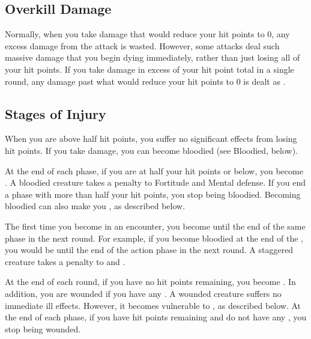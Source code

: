     \subsection{Overkill Damage}\label{Overkill Damage}
        Normally, when you take damage that would reduce your hit points to 0, any excess damage from the attack is wasted.
        However, some attacks deal such massive damage that you begin dying immediately, rather than just losing all of your hit points.
        If you take damage in excess of your  hit point total in a single round, any damage past what would reduce your hit points to 0 is dealt as .

    \subsection{Stages of Injury}

         When you are above half hit points, you suffer no significant effects from losing hit points.
        If you take damage, you can become bloodied (see Bloodied, below).

         At the end of each phase, if you are at half your hit points or below, you become .
        A bloodied creature takes a  penalty to Fortitude and Mental defense.
        If you end a phase with more than half your hit points, you stop being bloodied.
        Becoming bloodied can also make you , as described below.

        \label{Staggered}
        The first time you become  in an encounter, you become  until the end of the same phase in the next round.
        For example, if you become bloodied at the end of the , you would be  until the end of the action phase in the next round.
        A staggered creature takes a  penalty to  and .

        \label{Wounded} At the end of each round, if you have no hit points remaining, you become \wounded.
        In addition, you are wounded if you have any .
        A wounded creature suffers no immediate ill effects.
        However, it becomes vulnerable to , as described below.
        At the end of each phase, if you have hit points remaining and do not have any , you stop being wounded.

